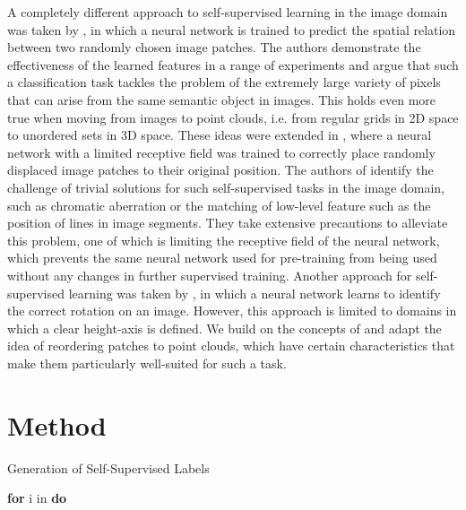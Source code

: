 \documentclass{article}
\begin{document}
A completely different approach to self-supervised learning in the image domain was taken by \cite{contextprediction}, in which a neural network is trained to predict the spatial relation between two randomly chosen image patches. The authors demonstrate the effectiveness of the learned features in a range of experiments and argue that such a classification task tackles the problem of the extremely large variety of pixels that can arise from the same semantic object in images. This holds even more true when moving from images to point clouds, i.e. from regular grids in 2D space to unordered sets in 3D space. These ideas were extended in \cite{jigsaw}, where a neural network with a limited receptive field was trained to correctly place randomly displaced image patches to their original position. The authors of \cite{contextprediction, jigsaw} identify the challenge of trivial solutions for such self-supervised tasks in the image domain, such as chromatic aberration or the matching of low-level feature such as the position of lines in image segments. They take extensive precautions to alleviate this problem, one of which is limiting the receptive field of the neural network, which prevents the same neural network used for pre-training from being used without any changes in further supervised training. Another approach for self-supervised learning was taken by \cite{rotation}, in which a neural network learns to identify the correct rotation on an image. However, this approach is limited to domains in which a clear height-axis is defined. We build on the concepts of \cite{jigsaw} and adapt the idea of reordering patches to point clouds, which have certain characteristics that make them particularly well-suited for such a task.




\section{Method}
\label{method}

\begin{algorithm}
  \caption{Generation of Self-Supervised Labels}\label{algorithm}\begin{algorithmic}[1]
    
       
      \State \textbf{for} i in  \textbf{do}
\State \Return{}
    \EndFunction
  \end{algorithmic}
\end{algorithm}
\end{document}
